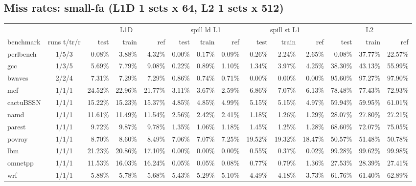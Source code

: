 \documentclass[10pt,a4paper,landscape]{article}
\begin{document}
\subsection*{Miss rates: small-fa (L1D 1 sets x 64, L2 1 sets x 512)}
{\footnotesize
\begin{longtable}{lcrrrrrrrrrrrr}
\toprule
& & \multicolumn{3}{c}{L1D} & \multicolumn{3}{c}{spill ld L1} & \multicolumn{3}{c}{spill st L1} & \multicolumn{3}{c}{L2} \\
\cmidrule(lr){3-5}\cmidrule(lr){6-8}\cmidrule(lr){9-11}\cmidrule(lr){12-14}
benchmark & runs t/tr/r & test & train & ref & test & train & ref & test & train & ref & test & train & ref \\
\midrule
\endhead
\bottomrule
\endfoot
perlbench & 1/5/3 & 0.08\% & 3.88\% & 4.32\% & 0.00\% & 0.17\% & 0.09\% & 0.26\% & 2.24\% & 2.65\% & 0.08\% & 37.77\% & 22.57\% \\
gcc & 1/3/5 & 5.69\% & 7.79\% & 9.08\% & 0.22\% & 0.89\% & 1.10\% & 1.34\% & 3.97\% & 4.25\% & 38.30\% & 43.13\% & 55.99\% \\
bwaves & 2/2/4 & 7.31\% & 7.29\% & 7.29\% & 0.86\% & 0.74\% & 0.71\% & 0.00\% & 0.00\% & 0.00\% & 95.60\% & 97.27\% & 97.90\% \\
mcf & 1/1/1 & 24.52\% & 22.96\% & 21.77\% & 3.11\% & 3.67\% & 2.59\% & 6.86\% & 7.07\% & 6.13\% & 78.48\% & 77.43\% & 72.93\% \\
cactuBSSN & 1/1/1 & 15.22\% & 15.23\% & 15.37\% & 4.85\% & 4.85\% & 4.99\% & 5.15\% & 5.15\% & 4.97\% & 59.94\% & 59.95\% & 61.01\% \\
namd & 1/1/1 & 11.61\% & 11.49\% & 11.54\% & 2.56\% & 2.42\% & 2.41\% & 1.18\% & 1.26\% & 1.29\% & 28.07\% & 27.80\% & 27.21\% \\
parest & 1/1/1 & 9.72\% & 9.87\% & 9.78\% & 1.35\% & 1.06\% & 1.18\% & 1.45\% & 1.25\% & 1.28\% & 68.60\% & 72.07\% & 75.05\% \\
povray & 1/1/1 & 8.70\% & 8.60\% & 8.49\% & 7.06\% & 7.07\% & 7.25\% & 19.52\% & 19.32\% & 18.47\% & 50.57\% & 51.48\% & 50.78\% \\
lbm & 1/1/1 & 21.23\% & 20.86\% & 17.10\% & 0.00\% & 0.00\% & 0.00\% & 0.55\% & 0.37\% & 0.02\% & 99.28\% & 99.62\% & 99.98\% \\
omnetpp & 1/1/1 & 11.53\% & 16.03\% & 16.24\% & 0.05\% & 0.05\% & 0.08\% & 0.77\% & 0.79\% & 1.36\% & 27.53\% & 28.39\% & 27.41\% \\
wrf & 1/1/1 & 5.88\% & 5.78\% & 5.68\% & 5.43\% & 5.29\% & 5.10\% & 4.49\% & 4.18\% & 3.73\% & 61.76\% & 61.40\% & 62.89\% \\

\end{longtable}}
\end{document}
